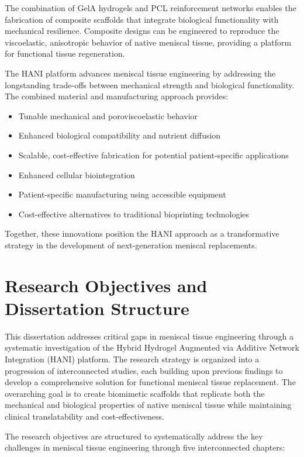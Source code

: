 The combination of GelA hydrogels and PCL reinforcement networks enables the fabrication of composite scaffolds that integrate biological functionality with mechanical resilience. Composite designs can be engineered to reproduce the viscoelastic, anisotropic behavior of native meniscal tissue, providing a platform for functional tissue regeneration.

The HANI platform advances meniscal tissue engineering by addressing the longstanding trade-offs between mechanical strength and biological functionality. The combined material and manufacturing approach provides:

\begin{itemize}
    \item Tunable mechanical and poroviscoelastic behavior
    \item Enhanced biological compatibility and nutrient diffusion
    \item Scalable, cost-effective fabrication for potential patient-specific applications
    \item Enhanced cellular biointegration
    \item Patient-specific manufacturing using accessible equipment
    \item Cost-effective alternatives to traditional bioprinting technologies
\end{itemize}

Together, these innovations position the HANI approach as a transformative strategy in the development of next-generation meniscal replacements.

\section{Research Objectives and Dissertation Structure}

This dissertation addresses critical gaps in meniscal tissue engineering through a systematic investigation of the Hybrid Hydrogel Augmented via Additive Network Integration (HANI) platform\cite{elkommos2025hybridhydrogels}. The research strategy is organized into a progression of interconnected studies, each building upon previous findings to develop a comprehensive solution for functional meniscal tissue replacement. The overarching goal is to create biomimetic scaffolds that replicate both the mechanical and biological properties of native meniscal tissue while maintaining clinical translatability and cost-effectiveness.

The research objectives are structured to systematically address the key challenges in meniscal tissue engineering through five interconnected chapters:

